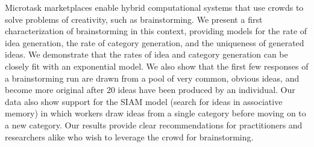 Microtask marketplaces enable hybrid computational systems that use crowds to solve problems of creativity, such as brainstorming. We present a first characterization of brainstorming in this context, providing models for the rate of idea generation, the rate of category generation, and the uniqueness of generated ideas. We demonstrate that the rates of idea and category generation can be closely fit with an exponential model. We also show that the first few responses of a brainstorming run are drawn from a pool of very common, obvious ideas, and become more original after 20 ideas have been produced by an individual. Our data also show support for the SIAM model (search for ideas in associative memory) \cite{nijstad_how_2006} in which workers draw ideas from a single category before moving on to a new category. Our results provide clear recommendations for practitioners and researchers alike who wish to leverage the crowd for brainstorming.


